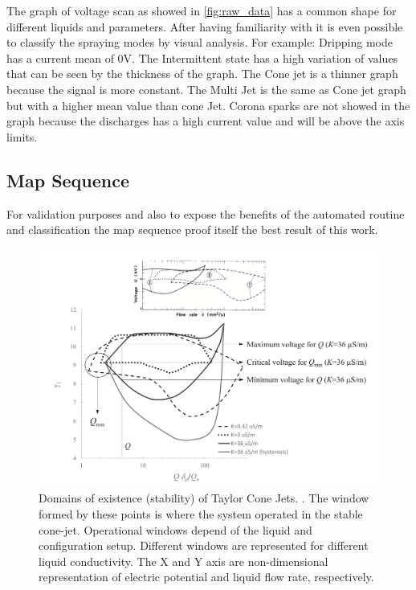 The graph of voltage scan as showed in \ref{fig:raw_data} has a common shape for different liquids and parameters. After having familiarity with it is even possible to classify the spraying modes by visual analysis. For example: 
Dripping mode has a current mean of 0V. The Intermittent state has a high variation of values that can be seen by the thickness of the graph. The Cone jet is a thinner graph because the signal is more constant. The Multi Jet is the same as Cone jet graph but with a higher mean value than cone Jet. Corona sparks are not showed in the graph because the discharges has a high current value and will be above the axis limits.



\subsection{Map Sequence}
\label{subsec:map_results}

For validation purposes and also to expose the benefits of the automated routine and classification the map sequence proof itself the best result of this work.

\begin{figure}[H]
    \center
    \includegraphics[width=13cm]{Figuras/ganan_calvo_map.png}
    \caption{Domains of existence (stability) of Taylor Cone Jets. \cite{gananCalvo} . The window formed by these points is where the system operated in the stable cone-jet. Operational windows depend of the liquid and configuration setup. Different windows are represented for different liquid conductivity. The X and Y axis are non-dimensional representation of electric potential and liquid flow rate, respectively.}
    \label{fig:ganan_calvo_fig}
\end{figure}


